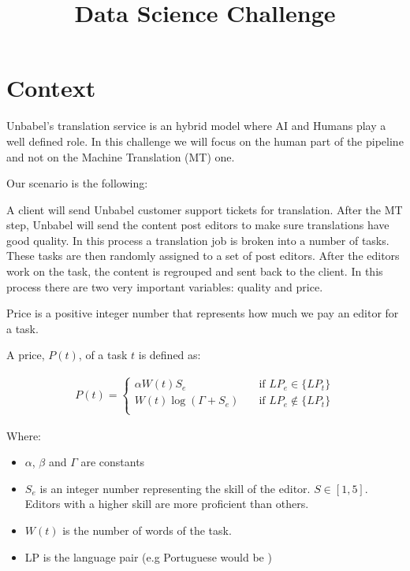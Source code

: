 \documentclass[]{extarticle}
\title{Data Science Challenge}
\begin{document}
\maketitle

\section{Context}

Unbabel's translation service is an hybrid model where AI and Humans play a well defined role. 
In this challenge we will focus on the human part of the pipeline and not on the Machine Translation (MT) one.

Our scenario is the following:

A client will send Unbabel customer support tickets for translation. After the MT step, Unbabel will send the content post editors to make sure translations have good quality. In this process a translation job is broken into a number of tasks. These tasks are then randomly assigned to a set of post editors. After the editors work on the task, the content is regrouped and sent back to the client. In this process there are two very important variables: quality and price.

Price is a positive integer number that represents how much we pay an editor for a task.

A price, $P(t)$, of a task $t$ is defined as:

\begin{align}
P(t) =
  \begin{cases}
    \alpha W(t)  S_e       & \quad \text{if } LP_e \in \{LP_t\}  \\
    W(t) \log(\Gamma + S_e)        & \quad \text{if } LP_e \notin \{LP_t\}  \\
  \end{cases}
\end{align}


Where:

\begin{itemize}
\item $\alpha$, $\beta$ and $\Gamma$ are constants
\item $S_e$ is an integer number representing the skill of the editor. $S \in [1,5]$. Editors with a higher skill are more proficient than others.
\item $W(t)$ is the number of words of the task.
\item LP is the language pair (e.g Portuguese would be )
\end{itemize}
\end{document}
